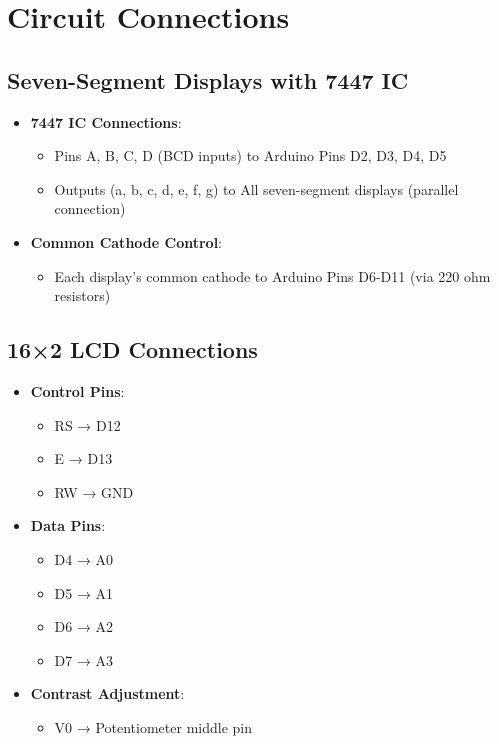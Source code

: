 \documentclass{article}
\begin{document}
\section{Circuit Connections}

\subsection{Seven-Segment Displays with 7447 IC}
\begin{itemize}
    \item \textbf{7447 IC Connections}:
    \begin{itemize}
        \item Pins A, B, C, D (BCD inputs) to Arduino Pins D2, D3, D4, D5
        \item Outputs (a, b, c, d, e, f, g) to All seven-segment displays (parallel connection)
    \end{itemize}
    \item \textbf{Common Cathode Control}:
    \begin{itemize}
        \item Each display's common cathode to Arduino Pins D6-D11 (via 220 ohm resistors)
    \end{itemize}
\end{itemize}

\subsection{16×2 LCD Connections}
\begin{itemize}
    \item \textbf{Control Pins}:
    \begin{itemize}
        \item RS → D12
        \item E → D13
        \item RW → GND
    \end{itemize}
    \item \textbf{Data Pins}:
    \begin{itemize}
        \item D4 → A0
        \item D5 → A1
        \item D6 → A2
        \item D7 → A3
    \end{itemize}
    \item \textbf{Contrast Adjustment}:
    \begin{itemize}
        \item V0 → Potentiometer middle pin
    \end{itemize}
\end{itemize}
\end{document}
